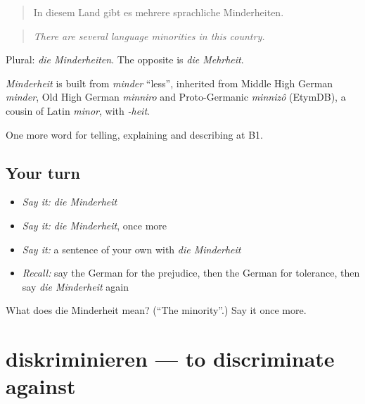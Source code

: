 \begin{quote}
In diesem Land gibt es mehrere sprachliche Minderheiten.
\end{quote}

\begin{quote}
\emph{There are several language minorities in this country.}
\end{quote}

Plural: \emph{die Minderheiten}. The opposite is \emph{die Mehrheit}.

\begin{cousinweb}
\emph{Minderheit} is built from \emph{minder} \textquotedblleft{}less\textquotedblright{}, inherited from Middle High German \emph{minder}, Old High German \emph{minniro} and Proto-Germanic \emph{minnizô} (EtymDB), a cousin of Latin \emph{minor}, with \emph{-heit}.
\end{cousinweb}

\begin{grammarlens}[title={What you've built}]
One more word for telling, explaining and describing at B1.
\end{grammarlens}

\subsection*{Your turn}
\begin{itemize}
\raggedright
  \item \emph{Say it:} \emph{die Minderheit}
  \item \emph{Say it:} \emph{die Minderheit}, once more
  \item \emph{Say it:} a sentence of your own with \emph{die Minderheit}
  \item \emph{Recall:} say the German for the prejudice, then the German for tolerance, then say \emph{die Minderheit} again
\end{itemize}

\begin{tcolorbox}[breakable,colback=teal!4,colframe=teal!35!black,title={Before you move on}]
What does die Minderheit mean? (\textquotedblleft{}The minority\textquotedblright{}.) Say it once more.
\end{tcolorbox}
\section[diskriminieren]{diskriminieren — to discriminate against}

\label{lesson:GE-C360-diskriminieren}



